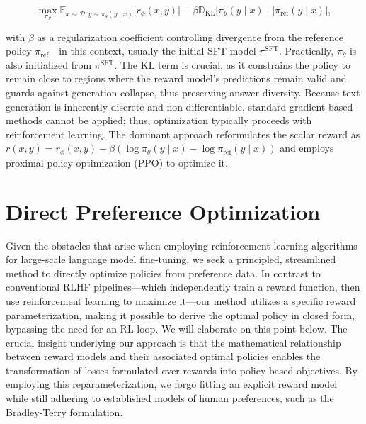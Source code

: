 \begin{equation}\label{eq:RL}
\max_{\pi_{\theta}}  \mathbb{E}_{x\sim \mathcal{D}, y\sim \pi_{\theta}(y \mid x)}\bigl[r_{\phi}(x, y)\bigr] - \beta\mathbb{D}_{\textrm{KL}}\bigl[\pi_{\theta}(y\mid x)\mid \mid \pi_\text{ref}(y\mid x)\bigr],
\end{equation}

with $\beta$ as a regularization coefficient controlling divergence from the reference policy $\pi_\text{ref}$—in this context, usually the initial SFT model $\pi^\text{SFT}$. 
Practically, $\pi_\theta$ is also initialized from $\pi^\text{SFT}$. The KL term is crucial, as it constrains the policy to remain close to regions where the reward model’s predictions remain valid and guards against generation collapse, thus preserving answer diversity. Because text generation is inherently discrete and non-differentiable, standard gradient-based methods cannot be applied; thus, optimization typically proceeds with reinforcement learning. The dominant approach \citep{ziegler2020finetuning, stiennon2022learning, bai2022training, ouyang2022training} reformulates the scalar reward as ${r(x, y) = r_{\phi}(x, y) -\beta (\log \pi_{\theta}(y\mid x) - \log \pi_\text{ref}(y\mid x))}$ and employs proximal policy optimization (PPO) \cite{schulman2017proximal} to optimize it. 

\section{Direct Preference Optimization}\label{sec:DPO}

Given the obstacles that arise when employing reinforcement learning algorithms for large-scale language model fine-tuning, we seek a principled, streamlined method to directly optimize policies from preference data. In contrast to conventional RLHF pipelines—which independently train a reward function, then use reinforcement learning to maximize it—our method utilizes a specific reward parameterization, making it possible to derive the optimal policy in closed form, bypassing the need for an RL loop. We will elaborate on this point below. The crucial insight underlying our approach is that the mathematical relationship between reward models and their associated optimal policies enables the transformation of losses formulated over rewards into policy-based objectives. By employing this reparameterization, we forgo fitting an explicit reward model while still adhering to established models of human preferences, such as the Bradley-Terry formulation.


